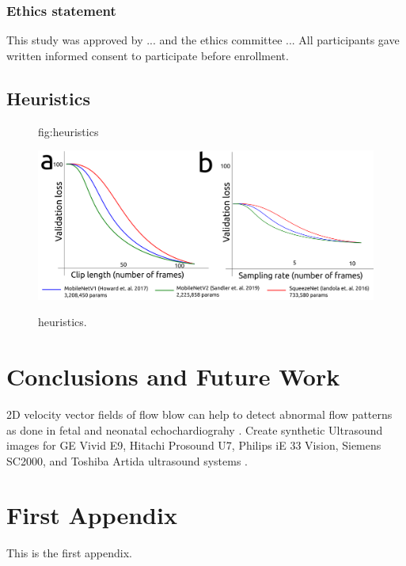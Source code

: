 \documentclass[mlabstract,twocolumn]{jmlr}
\begin{document}
\subsubsection{Ethics statement}
This study was approved by ... and the ethics committee ...
All participants gave written informed consent to participate before enrollment.


\subsection{Heuristics}


\begin{figure}[htbp]
\floatconts
  {fig:heuristics}
  {\caption{heuristics.}}
  {\includegraphics[width=\columnwidth]{../figures/heuristics/versions/drawing-v00}}%
\end{figure}


\section{Conclusions and Future Work}
2D velocity vector fields of flow blow can help to detect abnormal flow patterns as done in fetal and neonatal echochardiograhy \citep{Meyers2020}.
Create synthetic Ultrasound images for GE Vivid E9, Hitachi Prosound U7, Philips iE 33 Vision, Siemens SC2000, and Toshiba Artida ultrasound systems \citep{brindise2020unsupervised}.






\appendix

\section{First Appendix}\label{apd:first}
This is the first appendix.
\end{document}
